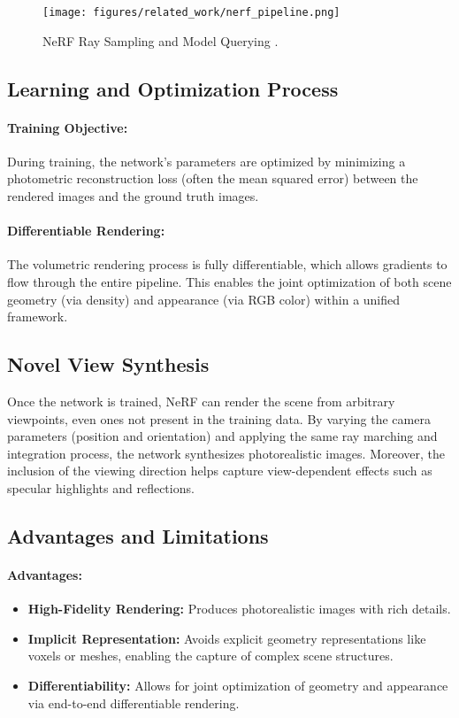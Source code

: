 \begin{figure}[h]
    \centering
    \texttt{[image: figures/related\_work/nerf\_pipeline.png]}
    \caption{NeRF Ray Sampling and Model Querying \cite{mildenhall2020nerf}.}
    \label{fig:nerf_pipeline}
\end{figure}

\subsection{Learning and Optimization Process}
\paragraph{Training Objective:} During training, the network's parameters are optimized by minimizing a photometric reconstruction loss (often the mean squared error) between the rendered images and the ground truth images.  
\paragraph{Differentiable Rendering:} The volumetric rendering process is fully differentiable, which allows gradients to flow through the entire pipeline. This enables the joint optimization of both scene geometry (via density) and appearance (via RGB color) within a unified framework.

\subsection{Novel View Synthesis}
Once the network is trained, NeRF can render the scene from arbitrary viewpoints, even ones not present in the training data. By varying the camera parameters (position and orientation) and applying the same ray marching and integration process, the network synthesizes photorealistic images. 
Moreover, the inclusion of the viewing direction helps capture view-dependent effects such as specular highlights and reflections.

\subsection{Advantages and Limitations}
\paragraph{Advantages:}
\begin{itemize}
    \item \textbf{High-Fidelity Rendering:} Produces photorealistic images with rich details.
    \item \textbf{Implicit Representation:} Avoids explicit geometry representations like voxels or meshes, enabling the capture of complex scene structures.
    \item \textbf{Differentiability:} Allows for joint optimization of geometry and appearance via end-to-end differentiable rendering.
\end{itemize}
